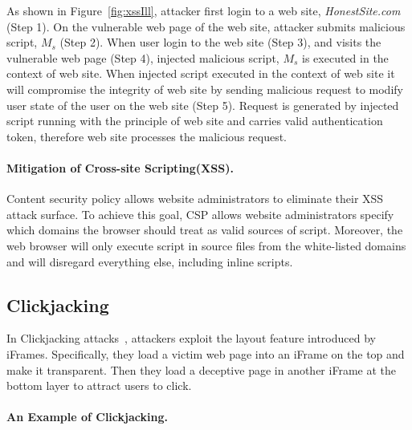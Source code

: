 As shown in Figure~\ref{fig:xssIll}, attacker first login to a web
site, {\em HonestSite.com} (Step 1). On the vulnerable web page of the
web site, attacker submits malicious script, $M_s$ (Step 2). When user
login to the web site (Step 3), and visits the vulnerable web page
(Step 4), injected malicious script, $M_s$ is executed in the context
of web site. When injected script executed in the context of web site
it will compromise the integrity of web site by sending malicious
request to modify user state of the user on the web site (Step
5). Request is generated by injected script running with the principle
of web site and carries valid authentication token, therefore web site
processes the malicious request.

\paragraph{\bf Mitigation of Cross-site Scripting(XSS).}
Content security policy allows website administrators to eliminate
their XSS attack surface. To achieve this goal, CSP allows website
administrators specify which domains the browser should treat as valid
sources of script. Moreover, the web browser will only execute script
in source files from the white-listed domains and will disregard
everything else, including inline scripts.

\subsection{Clickjacking}
In Clickjacking attacks~\cite{nex08,sectheory08}, attackers exploit
the layout feature introduced by iFrames. Specifically, they load a
victim web page into an iFrame on the top and make it
transparent. Then they load a deceptive page in another iFrame at the
bottom layer to attract users to click.

\paragraph{\bf An Example of Clickjacking.}

